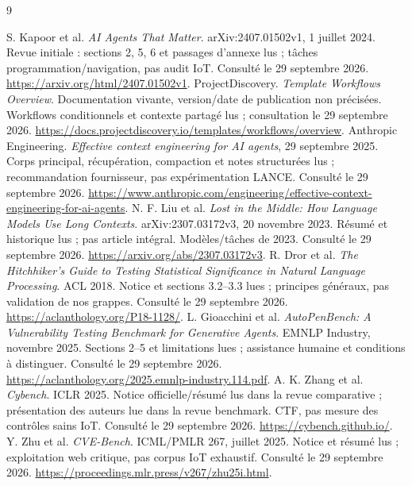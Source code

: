 \documentclass[11pt,a4paper]{article}
\begin{document}
\begin{thebibliography}{9}
\small
{} S. Kapoor et al. \emph{AI Agents That Matter}. arXiv:2407.01502v1, 1 juillet 2024. Revue initiale : sections 2, 5, 6 et passages d'annexe lus ; tâches programmation/navigation, pas audit IoT. Consulté le 29 septembre 2026. \url{https://arxiv.org/html/2407.01502v1}.
 ProjectDiscovery. \emph{Template Workflows Overview}. Documentation vivante, version/date de publication non précisées. Workflows conditionnels et contexte partagé lus ; consultation le 29 septembre 2026. \url{https://docs.projectdiscovery.io/templates/workflows/overview}.
 Anthropic Engineering. \emph{Effective context engineering for AI agents}, 29 septembre 2025. Corps principal, récupération, compaction et notes structurées lus ; recommandation fournisseur, pas expérimentation LANCE. Consulté le 29 septembre 2026. \url{https://www.anthropic.com/engineering/effective-context-engineering-for-ai-agents}.
 N. F. Liu et al. \emph{Lost in the Middle: How Language Models Use Long Contexts}. arXiv:2307.03172v3, 20 novembre 2023. Résumé et historique lus ; pas article intégral. Modèles/tâches de 2023. Consulté le 29 septembre 2026. \url{https://arxiv.org/abs/2307.03172v3}.
 R. Dror et al. \emph{The Hitchhiker's Guide to Testing Statistical Significance in Natural Language Processing}. ACL 2018. Notice et sections 3.2--3.3 lues ; principes généraux, pas validation de nos grappes. Consulté le 29 septembre 2026. \url{https://aclanthology.org/P18-1128/}.
 L. Gioacchini et al. \emph{AutoPenBench: A Vulnerability Testing Benchmark for Generative Agents}. EMNLP Industry, novembre 2025. Sections 2--5 et limitations lues ; assistance humaine et conditions à distinguer. Consulté le 29 septembre 2026. \url{https://aclanthology.org/2025.emnlp-industry.114.pdf}.
 A. K. Zhang et al. \emph{Cybench}. ICLR 2025. Notice officielle/résumé lus dans la revue comparative ; présentation des auteurs lue dans la revue benchmark. CTF, pas mesure des contrôles sains IoT. Consulté le 29 septembre 2026. \url{https://cybench.github.io/}.
 Y. Zhu et al. \emph{CVE-Bench}. ICML/PMLR 267, juillet 2025. Notice et résumé lus ; exploitation web critique, pas corpus IoT exhaustif. Consulté le 29 septembre 2026. \url{https://proceedings.mlr.press/v267/zhu25i.html}.
\end{thebibliography}
\end{document}
